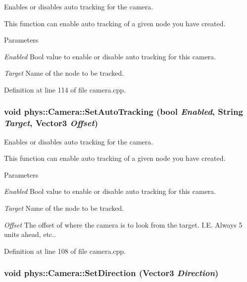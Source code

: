 Enables or disables auto tracking for the camera. 

This function can enable auto tracking of a given node you have created. 
\begin{DoxyParams}{Parameters}
\item[{\em Enabled}]Bool value to enable or disable auto tracking for this camera. \item[{\em Target}]Name of the node to be tracked. \end{DoxyParams}


Definition at line 114 of file camera.cpp.

\hypertarget{classphys_1_1Camera_ad49538281af9940dca156113cf006137}{
\subsubsection[{SetAutoTracking}]{\setlength{\rightskip}{0pt plus 5cm}void phys::Camera::SetAutoTracking (bool {\em Enabled}, \/  {\bf String} {\em Target}, \/  {\bf Vector3} {\em Offset})}}
\label{d9/df8/classphys_1_1Camera_ad49538281af9940dca156113cf006137}


Enables or disables auto tracking for the camera. 

This function can enable auto tracking of a given node you have created. 
\begin{DoxyParams}{Parameters}
\item[{\em Enabled}]Bool value to enable or disable auto tracking for this camera. \item[{\em Target}]Name of the node to be tracked. \item[{\em Offset}]The offset of where the camera is to look from the target. I.E. Always 5 units ahead, etc.. \end{DoxyParams}


Definition at line 108 of file camera.cpp.

\hypertarget{classphys_1_1Camera_a50746cdd4f7d483edffe87d24d2b4bc6}{
\subsubsection[{SetDirection}]{\setlength{\rightskip}{0pt plus 5cm}void phys::Camera::SetDirection ({\bf Vector3} {\em Direction})}}
\label{d9/df8/classphys_1_1Camera_a50746cdd4f7d483edffe87d24d2b4bc6}


